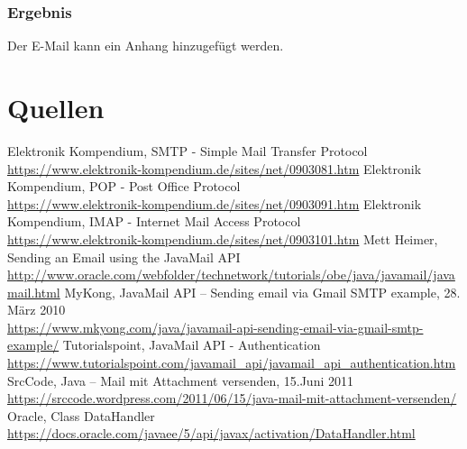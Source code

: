 \subsubsection{Ergebnis}
Der E-Mail kann ein Anhang hinzugefügt werden.

\section{Quellen}
\begin{thebibliography}{999}

 Elektronik Kompendium, SMTP - Simple Mail Transfer Protocol \\ \url{https://www.elektronik-kompendium.de/sites/net/0903081.htm}
 Elektronik Kompendium, POP - Post Office Protocol \\ \url{https://www.elektronik-kompendium.de/sites/net/0903091.htm}
 Elektronik Kompendium, IMAP - Internet Mail Access Protocol \\ \url{https://www.elektronik-kompendium.de/sites/net/0903101.htm}
 Mett Heimer, Sending an Email using the JavaMail API \\  \url{http://www.oracle.com/webfolder/technetwork/tutorials/obe/java/javamail/javamail.html}
 MyKong, JavaMail API – Sending email via Gmail SMTP example, 28. März 2010 \\ \url{https://www.mkyong.com/java/javamail-api-sending-email-via-gmail-smtp-example/}
 Tutorialspoint, JavaMail API - Authentication \\ \url{https://www.tutorialspoint.com/javamail_api/javamail_api_authentication.htm}
 SrcCode, Java – Mail mit Attachment versenden, 15.Juni 2011 \\ \url{https://srccode.wordpress.com/2011/06/15/java-mail-mit-attachment-versenden/}
 Oracle, Class DataHandler \\ \url{https://docs.oracle.com/javaee/5/api/javax/activation/DataHandler.html}

\end{thebibliography}




 
